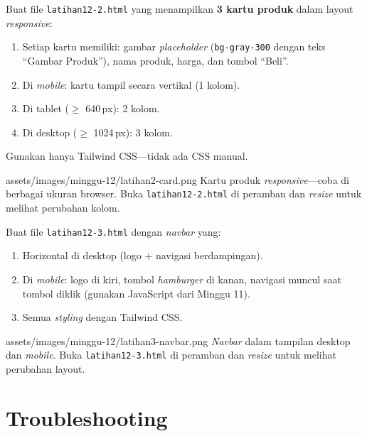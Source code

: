 \begin{latihan}
Buat file \texttt{latihan12-2.html} yang menampilkan \textbf{3 kartu produk} dalam layout \emph{responsive}:
\begin{enumerate}
  \item Setiap kartu memiliki: gambar \emph{placeholder} (\texttt{bg-gray-300} dengan teks ``Gambar Produk''), nama produk, harga, dan tombol ``Beli''.
  \item Di \emph{mobile}: kartu tampil secara vertikal (1 kolom).
  \item Di tablet ($\geq$ 640\,px): 2 kolom.
  \item Di desktop ($\geq$ 1024\,px): 3 kolom.
\end{enumerate}

Gunakan hanya Tailwind CSS---tidak ada CSS manual.

\begin{tangkapanlayar}
  {assets/images/minggu-12/latihan2-card.png}
  {Kartu produk \emph{responsive}---coba di berbagai ukuran browser.}
  {Buka \texttt{latihan12-2.html} di peramban dan \emph{resize} untuk melihat perubahan kolom.}
\end{tangkapanlayar}
\end{latihan}

\begin{latihan}
Buat file \texttt{latihan12-3.html} dengan \emph{navbar} yang:
\begin{enumerate}
  \item Horizontal di desktop (logo + navigasi berdampingan).
  \item Di \emph{mobile}: logo di kiri, tombol \emph{hamburger} di kanan, navigasi muncul saat tombol diklik (gunakan JavaScript dari Minggu 11).
  \item Semua \emph{styling} dengan Tailwind CSS.
\end{enumerate}

\begin{tangkapanlayar}
  {assets/images/minggu-12/latihan3-navbar.png}
  {\emph{Navbar} dalam tampilan desktop dan \emph{mobile}.}
  {Buka \texttt{latihan12-3.html} di peramban dan \emph{resize} untuk melihat perubahan layout.}
\end{tangkapanlayar}
\end{latihan}

\section{Troubleshooting}
\label{sec:12-troubleshooting}

